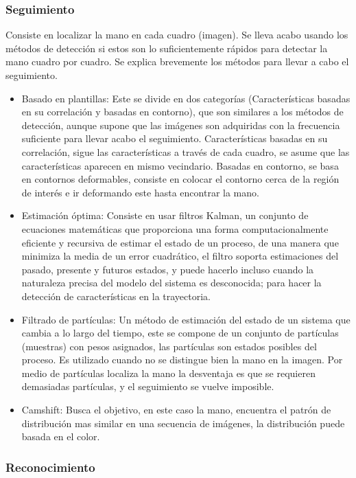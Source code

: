 \subsubsection{Seguimiento}

Consiste en localizar la mano en cada cuadro (imagen). Se lleva acabo usando los métodos de detección si estos son lo suficientemente rápidos para detectar la mano cuadro por cuadro. Se explica brevemente los métodos para llevar a cabo el seguimiento. 
\begin{itemize}
	\item Basado en plantillas: Este se divide en dos categorías (Características basadas en su correlación y basadas en contorno), que son similares a los métodos de detección, aunque supone que las imágenes son adquiridas con la frecuencia suficiente para llevar acabo el seguimiento. Características basadas en su correlación, sigue las características a través de cada cuadro, se asume que las características aparecen en mismo vecindario. Basadas en contorno, se basa en contornos deformables, consiste en colocar el contorno cerca de la región de interés e ir deformando este hasta encontrar la mano. 
	\item Estimación óptima: Consiste en usar filtros Kalman, un conjunto de ecuaciones matemáticas que proporciona una forma  computacionalmente eficiente y recursiva de estimar el estado de un proceso, de una manera que minimiza la media de un error cuadrático, el filtro soporta estimaciones del pasado, presente y futuros estados, y puede hacerlo incluso cuando la naturaleza precisa del modelo del sistema es desconocida;  para hacer la detección de características en la trayectoria. 
	\item Filtrado de partículas: Un método de estimación del estado de un sistema que cambia a lo largo del tiempo, este se compone de un conjunto de partículas (muestras) con pesos asignados, las partículas son estados posibles del proceso. Es utilizado cuando no se distingue bien la mano en la imagen. Por medio de partículas localiza la mano la desventaja es que se requieren demasiadas partículas, y el seguimiento se vuelve imposible. 
	\item Camshift: Busca el objetivo, en este caso la mano, encuentra el patrón de distribución mas similar en una secuencia de imágenes, la distribución puede basada en el color. 
\end{itemize}

\subsubsection{Reconocimiento}

